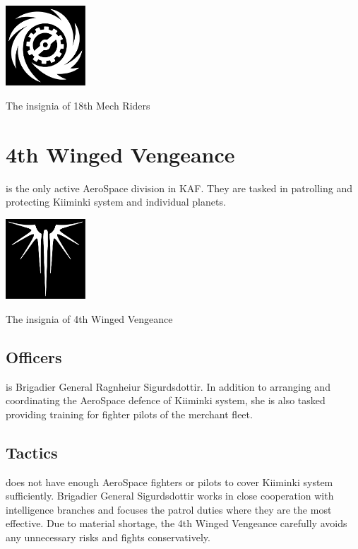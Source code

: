 \documentclass{tufte-book}
\begin{document}
\begin{marginfigure}[0\baselineskip]
  \includegraphics[width=3cm]{overdrive}
  \caption{The insignia of 18th Mech Riders}
  \label{fig:mech_riders}
\end{marginfigure}

\section{4th Winged Vengeance}

 is the only active AeroSpace division in
KAF. They are tasked in patrolling and protecting Kiiminki system and
individual planets.

\begin{marginfigure}[0\baselineskip]
  \includegraphics[width=3cm]{evil-wings}
  \caption{The insignia of 4th Winged Vengeance}
  \label{fig:winged_vengeance}
\end{marginfigure}

\subsection{Officers}

 is Brigadier General
Ragnhei\dh ur Sigurdsdottir. In addition to arranging and coordinating the
AeroSpace defence of Kiiminki system, she is also tasked providing training
for fighter pilots of the merchant fleet.

\subsection{Tactics}

 does not have enough AeroSpace fighters or
pilots to cover Kiiminki system sufficiently. Brigadier General Sigurdsdottir
works in close cooperation with intelligence branches and focuses the patrol
duties where they are the most effective. Due to material shortage, the 4th
Winged Vengeance carefully avoids any unnecessary risks and fights
conservatively.
\end{document}
